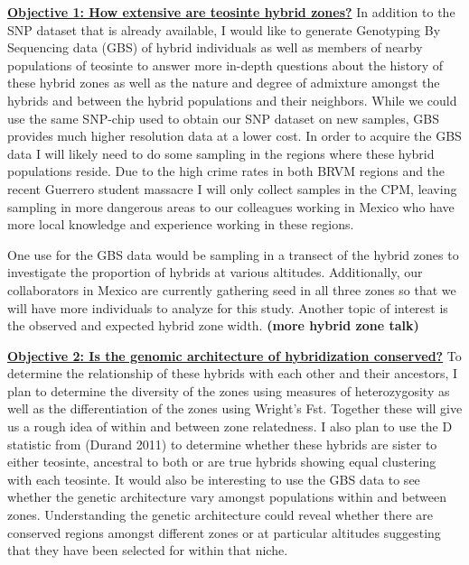 \documentclass[12pt]{amsart}
\begin{document}
\hfill\break \textbf{\underline{Objective 1: How extensive are teosinte hybrid zones?} } 
In addition to the SNP dataset that is already available, I would like to generate Genotyping By Sequencing data (GBS) of hybrid individuals as well as members of nearby populations of teosinte to answer more in-depth questions about the history of these hybrid zones as well as the nature and degree of admixture amongst the hybrids and between the hybrid populations and their neighbors.  
While we could use the same SNP-chip used to obtain our SNP dataset on new samples, GBS provides much higher resolution data at a lower cost.
In order to acquire the GBS data I will likely  need to do some sampling in the regions where these hybrid populations reside.  
Due to the high crime rates in both BRVM regions and the recent Guerrero student massacre I will only collect samples in the CPM, leaving sampling in more dangerous areas to our colleagues working in Mexico who have more local knowledge and experience working in these regions.

One use for the GBS data would be sampling in a transect of the hybrid zones to investigate the proportion of hybrids at various altitudes.  
Additionally, our collaborators in Mexico are currently gathering seed in all three zones so that we will have more individuals to analyze for this study.
Another topic of interest is the observed and expected hybrid zone width. \textbf{(more hybrid zone talk)}

\hfill\break \textbf{\underline{Objective 2: Is the genomic architecture of hybridization conserved?} } To determine the relationship of these hybrids with each other and their ancestors, I plan to determine the diversity of the zones using measures of heterozygosity as well as the differentiation of the zones using Wright's Fst.  
Together these will give us a rough idea of within and between zone relatedness.
I also plan to use the D statistic from (Durand 2011) to determine whether these hybrids are sister to either teosinte, ancestral to both or are true hybrids showing equal clustering with each teosinte.
It would also be interesting to use the GBS data to see whether the genetic architecture vary amongst populations within and between zones.
Understanding the genetic architecture could reveal whether there are conserved regions amongst different zones or at particular altitudes suggesting that they have been selected for within that niche.
\end{document}
